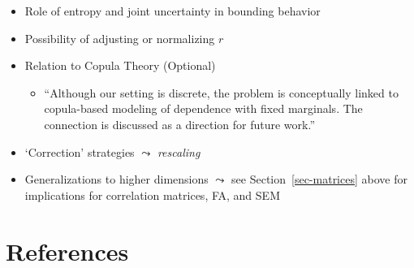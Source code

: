 \documentclass[
  12pt,
]{article}
\providecommand{\tightlist}{%
  \setlength{\itemsep}{0pt}\setlength{\parskip}{0pt}}
\theoremstyle{plain}
\theoremstyle{definition}
\theoremstyle{remark}
\begin{document}
\begin{itemize}
\tightlist
\item
  Role of entropy and joint uncertainty in bounding behavior\\
\item
  Possibility of adjusting or normalizing \(r\)
\item
  Relation to Copula Theory (Optional)

  \begin{itemize}
  \tightlist
  \item
    ``Although our setting is discrete, the problem is conceptually
    linked to copula-based modeling of dependence with fixed marginals.
    The connection is discussed as a direction for future work.''
  \end{itemize}
\item
  `Correction' strategies \(\leadsto\) \emph{rescaling}
\item
  Generalizations to higher dimensions \(\leadsto\) see
  Section~\ref{sec-matrices} above for implications for correlation
  matrices, FA, and SEM
\end{itemize}

\newpage

\section{References}\label{references}
\end{document}
